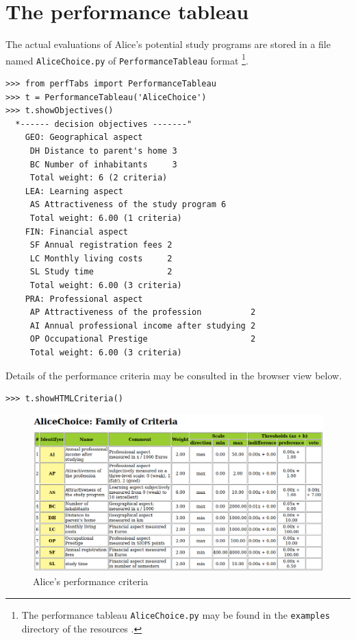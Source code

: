 \section{The performance tableau}
\label{sec:12.2}

The actual evaluations of Alice's potential study programs are stored in a file named \texttt{AliceChoice.py} of \texttt{PerformanceTableau} format \footnote{The performance tableau \texttt{AliceChoice.py} may be found in the \texttt{examples} directory of the \Digraph resources \citep{BIS-2021}.}.
\begin{lstlisting}[caption={Alice's performance tableau},label=list:12.1]
>>> from perfTabs import PerformanceTableau
>>> t = PerformanceTableau('AliceChoice')
>>> t.showObjectives()
  *------ decision objectives -------"
    GEO: Geographical aspect
     DH Distance to parent's home 3
     BC Number of inhabitants     3
     Total weight: 6 (2 criteria)
    LEA: Learning aspect
     AS Attractiveness of the study program 6
     Total weight: 6.00 (1 criteria)
    FIN: Financial aspect
     SF Annual registration fees 2
     LC Monthly living costs     2
     SL Study time               2
     Total weight: 6.00 (3 criteria)
    PRA: Professional aspect
     AP Attractiveness of the profession          2
     AI Annual professional income after studying 2
     OP Occupational Prestige                     2
     Total weight: 6.00 (3 criteria)
\end{lstlisting}

Details of the performance criteria may be consulted in the browser view below.
\begin{lstlisting}
>>> t.showHTMLCriteria()
\end{lstlisting}
\begin{figure}[ht]
\includegraphics[width=\hsize]{Figures/12-2-aliceCriteria.png}
\caption{Alice's performance criteria}
\label{fig:12.2}       %
\end{figure}

